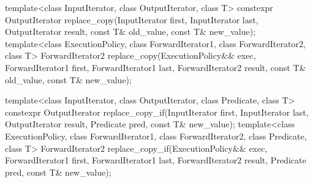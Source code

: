%
%
\begin{itemdecl}
template<class InputIterator, class OutputIterator, class T>
  constexpr OutputIterator
    replace_copy(InputIterator first, InputIterator last,
                 OutputIterator result,
                 const T& old_value, const T& new_value);
template<class ExecutionPolicy, class ForwardIterator1, class ForwardIterator2, class T>
  ForwardIterator2
    replace_copy(ExecutionPolicy&& exec,
                 ForwardIterator1 first, ForwardIterator1 last,
                 ForwardIterator2 result,
                 const T& old_value, const T& new_value);

template<class InputIterator, class OutputIterator, class Predicate, class T>
  constexpr OutputIterator
    replace_copy_if(InputIterator first, InputIterator last,
                    OutputIterator result,
                    Predicate pred, const T& new_value);
template<class ExecutionPolicy, class ForwardIterator1, class ForwardIterator2,
         class Predicate, class T>
  ForwardIterator2
    replace_copy_if(ExecutionPolicy&& exec,
                    ForwardIterator1 first, ForwardIterator1 last,
                    ForwardIterator2 result,
                    Predicate pred, const T& new_value);
\end{itemdecl}
